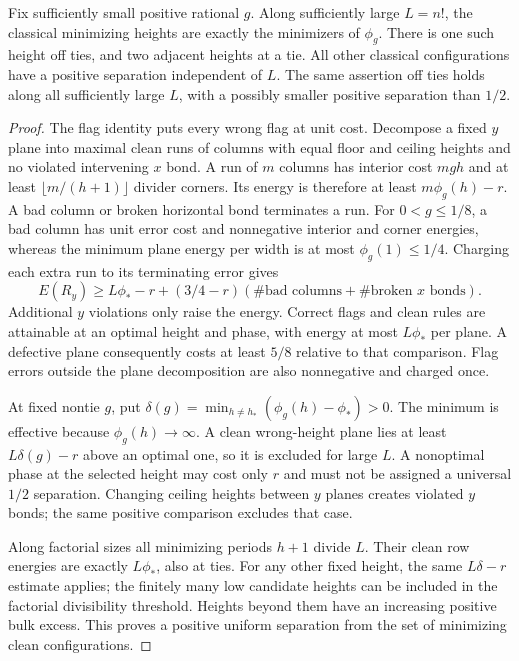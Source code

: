 \begin{lemma}
\label{lem:wetting-selection}
Fix sufficiently small positive rational $g$. Along sufficiently
large $L=n!$, the classical minimizing heights are exactly the
minimizers of $\phi_g$. There is one such height off ties, and
two adjacent heights at a tie. All other classical configurations
have a positive separation independent of $L$. The same assertion
off ties holds along all sufficiently large $L$, with a possibly
smaller positive separation than $1/2$.
\end{lemma}
\begin{proof}
The flag identity puts every wrong flag at unit cost. Decompose a
fixed $y$ plane into maximal clean runs of columns with equal floor
and ceiling heights and no violated intervening $x$ bond. A run of
$m$ columns has interior cost $mgh$ and at least
$\lfloor m/(h+1)\rfloor$ divider corners. Its energy is therefore
at least $m\phi_g(h)-r$. A bad column or broken horizontal bond
terminates a run. For $0<g\leq1/8$, a bad column has unit error
cost and nonnegative interior and corner energies, whereas the
minimum plane energy per width is at most $\phi_g(1)\leq1/4$.
Charging each extra run to its terminating error gives
\[
 E(R_y)\geq L\phi_*-r+
             (3/4-r)(\#\text{bad columns}+\#\text{broken }x\text{ bonds}).
\]
Additional $y$ violations only raise the energy. Correct flags and
clean rules are attainable at an optimal height and phase, with
energy at most $L\phi_*$ per plane. A defective plane consequently
costs at least $5/8$ relative to that comparison. Flag errors outside
the plane decomposition are also nonnegative and charged once.

At fixed nontie $g$, put
$\delta(g)=\min_{h\ne h_*}(\phi_g(h)-\phi_*)>0$. The minimum
is effective because $\phi_g(h)\to\infty$. A clean wrong-height
plane lies at least $L\delta(g)-r$ above an optimal one, so it is
excluded for large $L$. A nonoptimal phase at the selected height
may cost only $r$ and must not be assigned a universal $1/2$
separation. Changing ceiling heights between $y$ planes creates
violated $y$ bonds; the same positive comparison excludes that case.

Along factorial sizes all minimizing periods $h+1$ divide $L$.
Their clean row energies are exactly $L\phi_*$, also at ties.
For any other fixed height, the same $L\delta-r$ estimate applies;
the finitely many low candidate heights can be included in the
factorial divisibility threshold. Heights beyond them have an
increasing positive bulk excess. This proves a positive uniform
separation from the set of minimizing clean configurations.
\end{proof}

